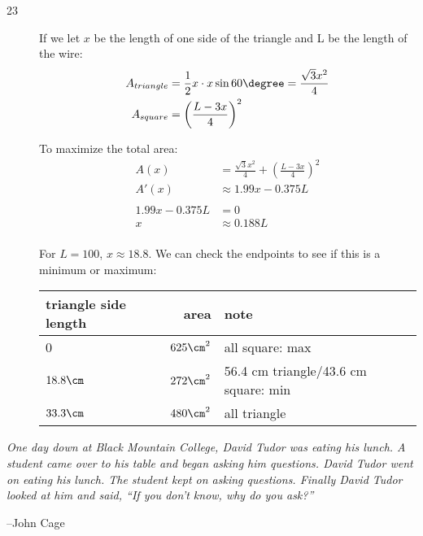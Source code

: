\documentclass[fleqn]{exam}
\begin{document}
\begin{description}
\pagebreak

\item[23]
If we let $x$ be the length of one side of the triangle and L be the length of the wire:
\begin{align*}
  A_{triangle} &= \frac{1}{2} x \cdot x \sin 60 \degree = \frac{\sqrt{3} x^2}{4} \\
  A_{square} &= \left( \frac{L - 3x}{4} \right)^2 \\
\end{align*}

To maximize the total area:
\begin{align*}
  A(x) &= \frac{\sqrt{3} x^2}{4} + \left( \frac{L - 3x}{4} \right)^2 \\
  A'(x) &\approx 1.99x - 0.375 L \\
\\
  1.99x - 0.375 L &= 0 \\
  x &\approx 0.188 L \\
\end{align*}

For $L = 100$, $x \approx 18.8$.  We can check the endpoints to see if this is a minimum or maximum:

\begin{tabular}{lrl}
\toprule
triangle side length & area & note \\
\midrule
0          & $625 \cm^2$ & all square: max \\
$18.8 \cm$ & $272 \cm^2$ & 56.4 cm triangle/43.6 cm square: min \\
$33.3 \cm$ & $480 \cm^2$ & all triangle\\
\bottomrule
\end{tabular}


\end{description}

\else

\vspace{4 cm}

{\em One day down at Black Mountain College, David Tudor was eating his lunch.  A student came over to his table and
  began asking him questions.  David Tudor went on eating his lunch.  The student kept on asking questions.  Finally
  David Tudor looked at him and said, ``If you don't know, why do you ask?''}

\vspace{.2 cm}

\hspace{1 cm} --John Cage

\fi
\end{document}

